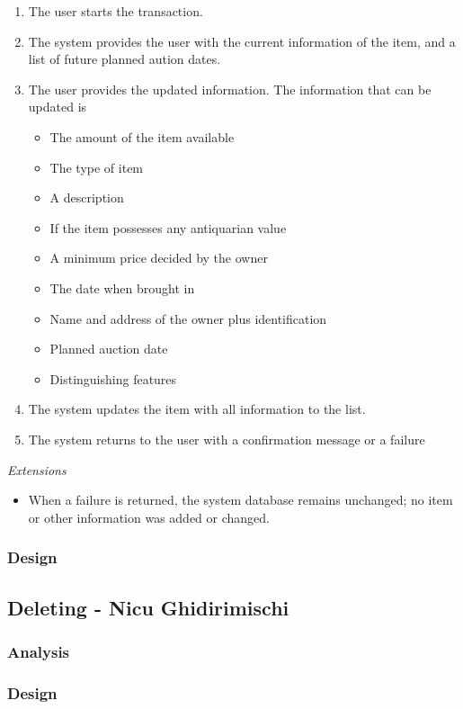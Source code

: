 \documentclass{article}
\begin{document}
\begin{enumerate}[noitemsep]
	\item The user starts the transaction.
	\item The system provides the user with the current information of the item, and a list of future planned aution dates.
	\item The user provides the updated information. The information that can be updated is
	\begin{itemize}[noitemsep]
		\item The amount of the item available
		\item The type of item
		\item A description
		\item If the item possesses any antiquarian value
		\item A minimum price decided by the owner
		\item The date when brought in
		\item Name and address of the owner plus identification
		\item Planned auction date
		\item Distinguishing features
	\end{itemize}
	\item The system updates the item with all information to the list.
	\item The system returns to the user with a confirmation message or a failure
\end{enumerate}
\textsl{Extensions}
\begin{itemize}[noitemsep]
	\item When a failure is returned, the system database remains unchanged; no item or other information was added or changed.
\end{itemize}
\subsubsection*{Design}
\subsection*{Deleting - Nicu Ghidirimischi}
\subsubsection*{Analysis}
\subsubsection*{Design}
\end{document}
